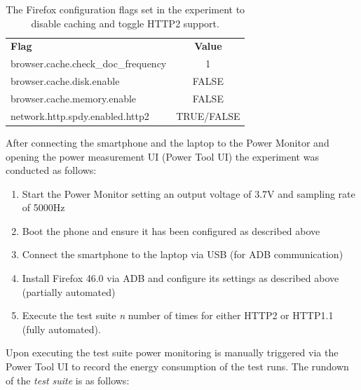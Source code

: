 \documentclass{article}
\begin{document}
\begin{table}[h!]
    \centering
    \caption{The Firefox configuration flags set in the experiment to disable caching and toggle HTTP2 support.}
    \label{table:firefox_flags}
    \begin{tabular}{l|c}
        \textbf{Flag} & \textbf{Value} \\
        browser.cache.check\_doc\_frequency & 1 \\
        browser.cache.disk.enable           & FALSE \\
        browser.cache.memory.enable         & FALSE \\
        network.http.spdy.enabled.http2     & TRUE/FALSE
    \end{tabular}
\end{table}

After connecting the smartphone and the laptop to the Power Monitor and opening the power measurement UI (Power Tool UI) the experiment was conducted as follows:

\begin{enumerate}
    \item Start the Power Monitor setting an output voltage of 3.7V and sampling rate of 5000Hz
    \item Boot the phone and ensure it has been configured as described above
    \item Connect the smartphone to the laptop via USB (for ADB communication)
    \item Install Firefox 46.0 via ADB and configure its settings as described above (partially automated)
    \item Execute the test suite \emph{n} number of times for either HTTP2 or HTTP1.1 (fully automated).
\end{enumerate}

Upon executing the test suite power monitoring is manually triggered via the Power Tool UI to record the energy consumption of the test runs. The rundown of the \emph{test suite} is as follows:
\end{document}
